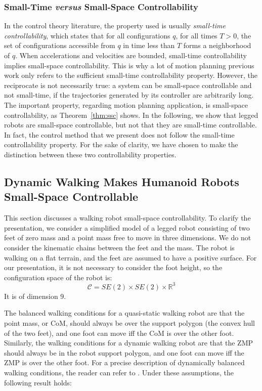 \documentclass{article}
\begin{document}
\subsubsection{Small-Time \textit{versus} Small-Space Controllability}
In the control theory literature, the property used is usually \textit{small-time controllability}, 
which states that for  all configurations  $q$, for  all times
$T>0$, the set of configurations accessible from $q$ in time less than
$T$ forms a  neighborhood of $q$. When accelerations and velocities are bounded,
small-time controllability implies small-space controllability. This is why 
a lot of motion planning previous work only refers to the sufficient small-time controllability
property. However, the reciprocate is not necessarily true:  a system can be 
small-space controllable and
not small-time, if the trajectories generated by its controller are arbitrarily long.
The important property, regarding
motion planning application, is small-space controllability, as 
Theorem~\ref{thm:ssc} shows. In the following, we show that legged robots
are small-space controllable, but  not that they are small-time controllable.
In fact, the  control method that we present does not follow the small-time controllability
property. For the sake of clarity, we have chosen to make the distinction between these
two controllability properties.



\subsection{Dynamic Walking Makes Humanoid Robots Small-Space Controllable}
\label{sec:humanoid-ssc}

This section  discusses a walking robot small-space controllability. To clarify
the presentation, we consider a simplified model of a legged robot consisting of two feet
of zero mass and a point mass free to move in three dimensions.
We do not consider 
the kinematic chains between the feet and the mass. The robot is walking on a flat terrain,
and the feet are assumed to have a positive surface. For our presentation, it is not 
necessary to consider the foot height, so the configuration space of the robot is:
\[
\mathcal{C} = SE(2) \times SE(2) \times \mathbb{R}^3
\]
It is of dimension 9.


The balanced walking conditions for a quasi-static walking robot are that the point
mass, or CoM, should always be over the support polygon (the convex hull of the two feet), and 
one foot can move iff the CoM is over the other foot. Similarly, the walking
conditions for a dynamic walking robot are that the ZMP should
always be in the robot support polygon, and one foot can move iff the ZMP is over the other 
foot. For a precise description of dynamically balanced walking conditions, the reader can refer
to \cite{wieber2002}. Under these assumptions, the following result holds:
\end{document}
